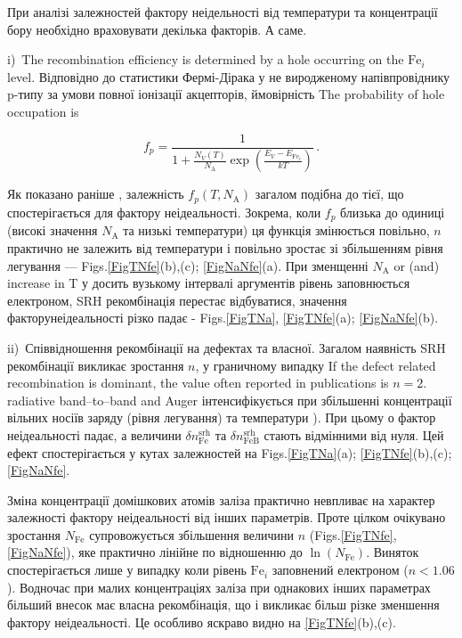 \documentclass[12pt]{article}
\begin{document}
При аналізі залежностей фактору неідельності від температури та концентрації бору необхідно враховувати декілька факторів. А саме.

i)~The recombination efficiency is determined by a hole occurring on the $\mathrm{Fe}_i$ level.
Відповідно до статистики Фермі-Дірака у не виродженому напівпровіднику p-типу за умови повної іонізації акцепторів, ймовірність
The probability of hole occupation is

\begin{equation}
\label{eqfp}
 f_p=\frac{1}{1+\frac{N_V(T)}{N_\mathrm{A}}\exp\left(\frac{E_V-E_{\mathrm{Fe}_i}}{kT}\right)}\,.
\end{equation}

Як показано раніше  \cite{Olikh2018SM}, залежність $f_p(T,N_\mathrm{A})$ загалом подібна до тієї, що спостерігається для фактору неідеальності.
Зокрема, коли  $f_p$ близька до одиниці (високі значення $N_\mathrm{A}$ та низькі температури) ця функція змінюється повільно, $n$ практично не залежить від температури і повільно зростає зі збільшенням рівня легування --- Figs.\ref{FigTNfe}(b),(c); \ref{FigNaNfe}(a).
При зменщенні $N_\mathrm{A}$ or (and) increase in T у досить вузькому інтервалі аргументів рівень заповнюється електроном, SRH рекомбінація перестає відбуватися, значення факторунеідеальності  різко падає - Figs.\ref{FigTNa}, \ref{FigTNfe}(a); \ref{FigNaNfe}(b).

ii)~Співвідношення рекомбінації на дефектах та власної.
Загалом наявність SRH рекомбінації викликає зростання $n$, у граничному випадку
If the defect related recombination is dominant, the value often reported in publications is $n=2$.
radiative band--to--band and Auger інтенсифікується при збільшенні концентрації вільних носіїв заряду (рівня легування) та температури \cite{Si_BtB,Si_Auger}).
При цьому
о фактор неідеальності падає, а величини
$\delta n_\mathrm{Fe}^\mathrm{srh}$
та
$\delta n_\mathrm{FeB}^\mathrm{srh}$
стають відмінними від нуля.
Цей ефект спостерігається у кутах залежностей на  Figs.\ref{FigTNa}(a); \ref{FigTNfe}(b),(c); \ref{FigNaNfe}.

Зміна концентрації домішкових атомів заліза практично невпливає на характер залежності фактору неідеальності від інших параметрів.
Проте цілком очікувано зростання $N_\mathrm{Fe}$  супровожується збільшення величини $n$
(Figs.\ref{FigTNfe}, \ref{FigNaNfe}), яке практично лінійне по відношенню до $\ln(N_\mathrm{Fe})$.
Виняток спостерігається лише у випадку коли рівень $\mathrm{Fe}_i$ заповнений електроном ($n<1.06$).
Водночас при малих концентраціях заліза при однакових інших параметрах більший внесок має власна рекомбінація, що і викликає більш різке зменшення фактору неідеальності.
Це особливо яскраво видно на \ref{FigTNfe}(b),(c).
\end{document}
